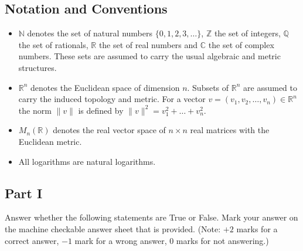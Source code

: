 \documentclass[11pt, a4paper]{article}
\begin{document}
\subsection*{Notation and Conventions}
\begin{itemize}
  \item $\mathbb{N}$ denotes the set of natural numbers $\{0, 1, 2, 3, \dots\}$, $\mathbb{Z}$ the set of integers, $\mathbb{Q}$ the set of rationals, $\mathbb{R}$ the set of real numbers and $\mathbb{C}$ the set of complex numbers. These sets are assumed to carry the usual algebraic and metric structures.
  \item $\mathbb{R}^n$ denotes the Euclidean space of dimension $n$. Subsets of $\mathbb{R}^n$ are assumed to carry the induced topology and metric. For a vector $v = (v_1, v_2, \dots, v_n) \in \mathbb{R}^n$ the norm $\|v\|$ is defined by $\|v\|^2 = v_1^2 + \dots + v_n^2$.
  \item $M_n(\mathbb{R})$ denotes the real vector space of $n \times n$ real matrices with the Euclidean metric.
  \item All logarithms are natural logarithms.
\end{itemize}

\subsection*{Part I}
Answer whether the following statements are True or False. Mark your answer on the machine checkable answer sheet that is provided. (Note: $+2$ marks for a correct answer, $-1$ mark for a wrong answer, $0$ marks for not answering.)
\end{document}

